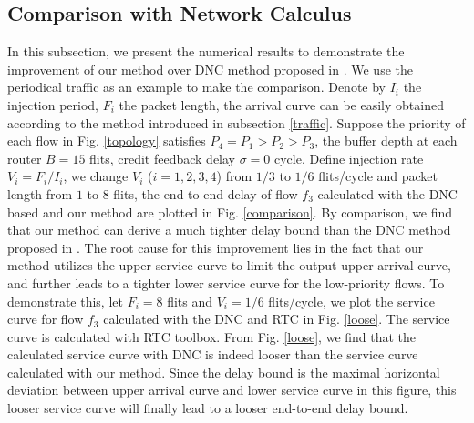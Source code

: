 \documentclass[10pt,journal]{IEEEtran}
\begin{document}
\subsection{Comparison with Network Calculus}\label{dnccmp}
In this subsection, we present the numerical results to demonstrate the improvement of our method over DNC method proposed in \cite{Qian489900}. We use the periodical traffic as an example to make the comparison. Denote by $I_i$ the injection period, $F_i$ the packet length, the arrival curve can be easily obtained according to the method introduced in subsection \ref{traffic}. Suppose the priority of each flow in Fig. \ref{topology} satisfies $P_4=P_1>P_2>P_3$, the buffer depth at each router $B=15$ flits, credit feedback delay $\sigma=0$ cycle. Define injection rate $V_i=F_i/I_i$, we change $V_i$ ($i=1,2,3,4$) from $1/3$ to $1/6$ flits/cycle and packet length from $1$ to $8$ flits, the end-to-end delay of flow $f_3$ calculated with the DNC-based and our method are plotted in Fig. \ref{comparison}. By comparison, we find that our method can derive a much tighter delay bound than the DNC method proposed in \cite{Qian489900}. The root cause for this improvement lies in the fact that our method utilizes the upper service curve to limit the output upper arrival curve, and further leads to a tighter lower service curve for the low-priority flows. To demonstrate this, let $F_i=8$ flits and $V_i=1/6$ flits/cycle, we plot the service curve for flow $f_3$ calculated with the DNC and RTC in Fig. \ref{loose}. The service curve is calculated with RTC toolbox. From Fig. \ref{loose}, we find that the calculated service curve with DNC is indeed looser than the service curve calculated with our method. Since the delay bound is the maximal horizontal deviation between upper arrival curve and lower service curve in this figure, this looser service curve will finally lead to a looser end-to-end delay bound.
\end{document}
